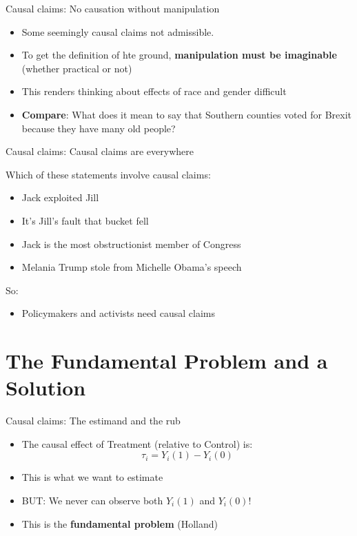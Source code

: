 \documentclass[11pt,ignorenonframetext,]{beamer}
\providecommand{\tightlist}{%
  \setlength{\itemsep}{0pt}\setlength{\parskip}{0pt}}
\begin{document}
\begin{frame}{Causal claims: No causation without manipulation}

\begin{itemize}
\tightlist
\item
  Some seemingly causal claims not admissible.
\item
  To get the definition of hte ground, \textbf{manipulation must be
  imaginable} (whether practical or not)
\item
  This renders thinking about effects of race and gender difficult
\item
  \textbf{Compare}: What does it mean to say that Southern counties
  voted for Brexit because they have many old people?
\end{itemize}

\end{frame}

\begin{frame}{Causal claims: Causal claims are everywhere}

Which of these statements involve causal claims:

\begin{itemize}
\tightlist
\item
  Jack exploited Jill
\item
  It's Jill's fault that bucket fell
\item
  Jack is the most obstructionist member of Congress
\item
  Melania Trump stole from Michelle Obama's speech
\end{itemize}

So:

\begin{itemize}
\tightlist
\item
  Policymakers and activists need causal claims
\end{itemize}

\end{frame}

\section{The Fundamental Problem and a
Solution}\label{the-fundamental-problem-and-a-solution}

\begin{frame}{Causal claims: The estimand and the rub}

\begin{itemize}
    \item  The causal effect of Treatment (relative to Control) is:
    $$ \tau_i = Y_i(1) - Y_i(0)$$
    \item This is what we want to estimate 
    \item BUT: We never can observe both $Y_i(1)$ and $Y_i(0)$!
    \item This is the \textbf{fundamental problem} (Holland)
\end{itemize}

\end{frame}
\end{document}
